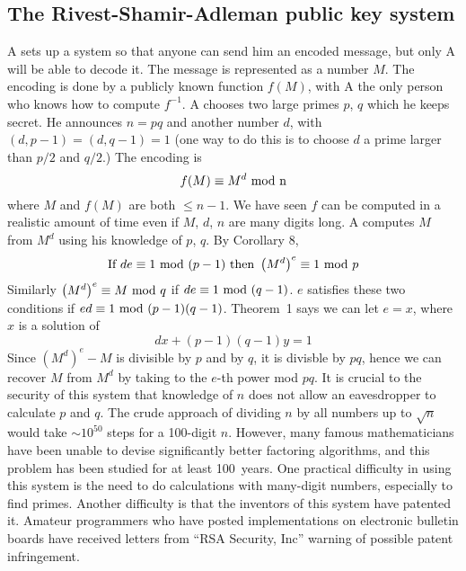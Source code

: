 \subsection{The Rivest-Shamir-Adleman public key system}
A sets up a system so that anyone can send him an encoded
message, but only A will be able to decode it.  The message is represented
as a number $M$.  The encoding is done by a publicly known function $f(M)$,
with A the only person who knows how to compute $f^{-1}$.
A chooses two large primes $p$, $q$ which he keeps secret.  He announces
$n=pq$ and another number $d$, with $(d,p-1)=(d,q-1)=1$ (one way to
do this is to choose $d$ a prime larger than $p/2$ and $q/2$.)
The encoding is $$f(M)\equiv M^d\hbox{
mod n}$$where $M$ and $f(M)$ are both $\le n-1$.
We have seen $f$ can be computed in a realistic amount of time
even if $M$, $d$, $n$ are many digits long.
\pq A computes $M$ from $M^d$ using his knowledge of $p$, $q$. By
 Corollary 8, $$\hbox{If }de\equiv1\hbox{ mod }(p-1)\hbox{ then }\left(M^d\right)^e\equiv1\hbox{ mod }p$$Similarly $\left(M^d\right)^e\equiv M\hbox{ mod }q$ if $de\equiv1\hbox{ mod }(q-1)$.
$e$ satisfies these two conditions if $ed\equiv1\hbox{ mod }(p-1)(q-1)$.  Theorem~1
says we can let $e=x$, where $x$ is a solution of $$dx+(p-1)(q-1)y=1$$
Since $\left(M^d\right)^e-M$ is divisible by $p$ and by $q$, it is
divisble by $pq$, hence we can recover $M$ from $M^d$ by taking to
the $e$-th power mod $pq$.
\pq It is crucial to the security of this system that knowledge of
$n$ does not allow an eavesdropper to calculate $p$ and $q$. The
crude approach of dividing $n$ by all numbers up to $\sqrt n$ would
take $\sim10^{50}$ steps for a 100-digit $n$. However, many famous
mathematicians have been unable to devise significantly better
factoring algorithms, and this problem has been studied for at
least 100~years.
\pq One practical difficulty in using this system is the need to
do calculations with many-digit numbers, especially to find primes.
Another difficulty is that the inventors of this system have patented
it.  Amateur programmers who have posted implementations on electronic
bulletin boards have received letters from ``RSA Security, Inc''
warning of possible patent infringement.
